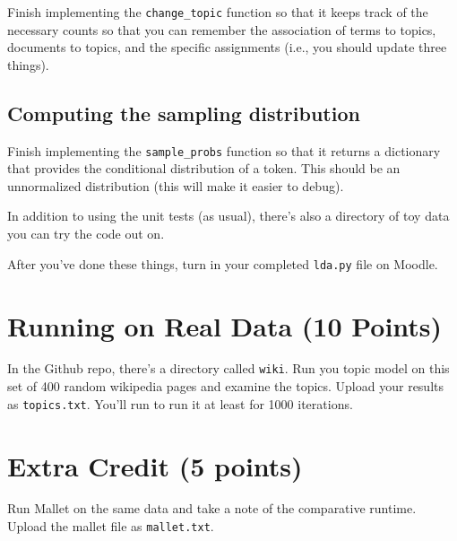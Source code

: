 \documentclass[11pt]{article}
\begin{document}
Finish implementing the \texttt{change\_topic} function so that it keeps track of the necessary counts so that you can remember the association of terms to topics, documents to topics, and the specific assignments (i.e., you should update three things).

\subsection{Computing the sampling distribution}

Finish implementing the \texttt{sample\_probs} function so that it returns a dictionary that provides the conditional distribution of a token.  This should be an unnormalized distribution (this will make it easier to debug).

In addition to using the unit tests (as usual), there's also a directory of toy data you can try the code out on.

After you've done these things, turn in your completed \texttt{lda.py} file on Moodle.

\section{Running on Real Data (10 Points)}

In the Github repo, there's a directory called \texttt{wiki}.  Run you topic model on this set of 400 random wikipedia pages and examine the topics.  Upload your results as \texttt{topics.txt}.  You'll run to run it at least for 1000 iterations.

\section{Extra Credit (5 points)}

Run Mallet on the same data and take a note of the comparative runtime.  Upload the mallet file as \texttt{mallet.txt}.
\end{document}

